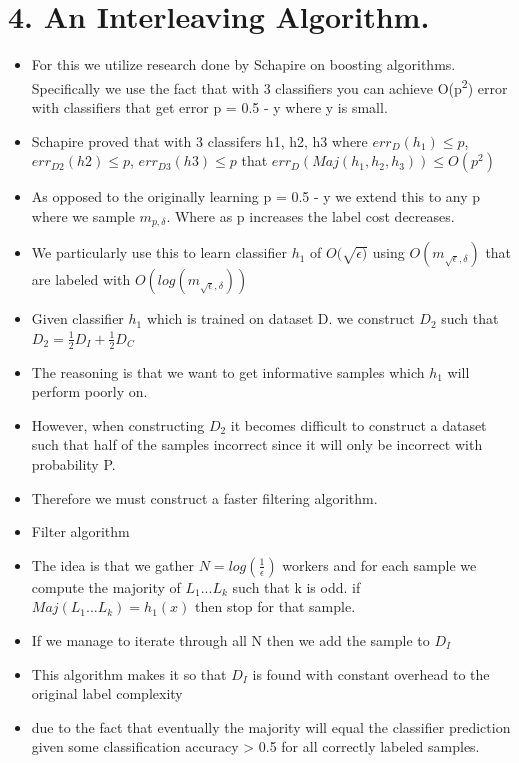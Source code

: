 \documentclass[11pt]{article}
\begin{document}
\section{4. An Interleaving Algorithm.}
\label{sec:orgcbc8cd5}
\begin{itemize}
\item For this we utilize research done by Schapire on boosting algorithms. Specifically we use the fact that with 3 classifiers you can achieve O(p\textsuperscript{2}) error with classifiers that get error p = 0.5 - y where y is small.
\item Schapire proved that with 3 classifers h1, h2, h3 where \(err_D(h_1) \leq p\), \(err_{D2}(h2) \leq p\), \(err_{D3}(h3) \leq p\) that \(err_D(Maj(h_1,h_2,h_3)) \leq O(p^2)\)
\item As opposed to the originally learning p = 0.5 - y we extend this to any p where we sample \(m_{p,\delta}\). Where as p increases the label cost decreases.
\item We particularly use this to learn classifier \(h_1\) of \(O(\sqrt{\epsilon)}\) using \(O(m_{\sqrt{\epsilon},\delta})\) that are labeled with \(O(log(m_{\sqrt{\epsilon},\delta}))\)
\item Given classifier \(h_1\) which is trained on dataset D. we construct \(D_2\) such that \(D_2 = \frac{1}{2} D_I + \frac{1}{2} D_C\)
\item The reasoning is that we want to get informative samples which \(h_1\) will perform poorly on.
\item However, when constructing \(D_2\) it becomes difficult to construct a dataset such that half of the samples incorrect since it will only be incorrect with probability P.
\item Therefore we must construct a faster filtering algorithm.
\item Filter algorithm
\item The idea is that we gather \(N=log(\frac{1}{\epsilon})\) workers and for each sample we compute the majority of \(L_1 ... L_k\) such that k is odd. if \(Maj(L_1...L_k) = h_1(x)\) then stop for that sample.
\item If we manage to iterate through all N then we add the sample to \(D_I\)
\item This algorithm makes it so that \(D_I\) is found with constant overhead to the original label complexity
\item due to the fact that eventually the majority will equal the classifier prediction given some classification accuracy > 0.5 for all correctly labeled samples.

\end{itemize}
\end{document}
